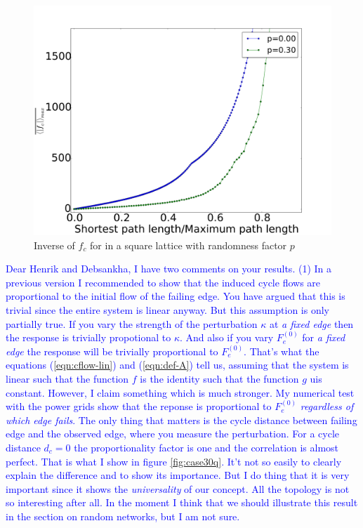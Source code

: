 \documentclass[10pt,aps,pra,twocolumn,superscriptaddress]{revtex4-1}
\newcommand{\dirk}[1]{\textcolor{blue}{#1}}
\begin{document}
\begin{figure}
    \includegraphics[width=.9\columnwidth]{pics/decay_2p_inv}	
    \caption{Inverse of $f_c$ for in a square lattice with randomness factor $p$}
    \label{fig-decay-2p-inv}
\end{figure}


\dirk{
Dear Henrik and Debsankha, I have two comments on your results. 
(1) In a previous version I recommended to show that the induced cycle flows are 
proportional to the initial flow of the failing edge. You have argued that this is trivial 
since the entire system is linear anyway. 
But this assumption is only partially true. If you vary the strength of the perturbation
$\kappa$ at \emph{a fixed edge} then the response is trivially propotional to $\kappa$.
And also if you vary $F_e^{(0)}$ for \emph{a fixed edge} the response will be 
trivially proportional to $F_e^{(0)}$. That's what the equations (\ref{eqn:cflow-lin}) 
and (\ref{eqn:def-A}) tell us, assuming that the system is linear such that the function 
$f$ is the identity such that the function $g$ uis constant.
However, I claim something which is much stronger. My numerical test with the power 
grids show that the reponse is proportional to $F_e^{(0)}$ \emph{regardless of which
edge fails}. The only thing that matters is the cycle distance between failing edge and
the observed edge, where you measure the perturbation. For a cycle distance $d_c=0$
the proportionality factor is one and the correlation is almost perfect. That is what I show 
in figure \ref{fig:case30q}.
It't not so easily to clearly explain the difference and to show its importance. But I do thing
that it is very important since it shows the \emph{universality} of our concept. All the 
topology is not so interesting after all. In the moment I think that we should illustrate this
result in the section on random networks, but I am not sure.
}
\end{document}
